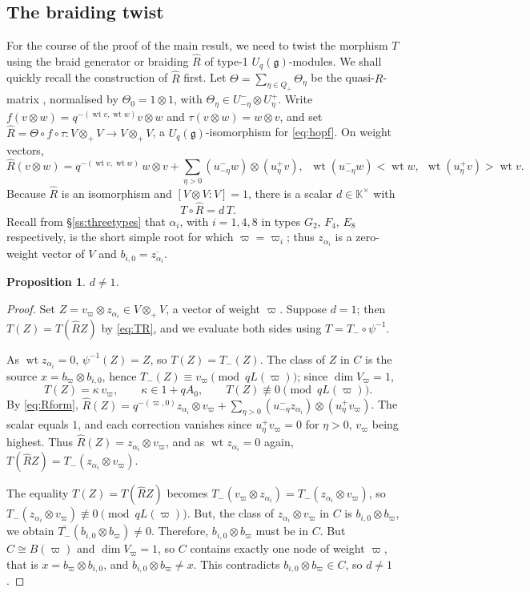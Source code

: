\documentclass[12pt]{amsart}
\theoremstyle{plain}
\newtheorem{proposition}[theorem]{Proposition}
\theoremstyle{remark}
\newcommand{\g}{\mathfrak{g}}
\newcommand{\Uq}{U_q(\g)}
\newcommand{\wt}{\operatorname{wt}}
\newcommand{\ot}{\otimes}
\newcommand{\vp}{\varpi}
\newcommand{\Rhat}{\widehat{R}}
\newcommand{\Qp}{Q_{+}}
\newcommand{\K}{\mathbb{K}}
\begin{document}
\subsection{The braiding twist}\label{ss:braid}
For the course of the proof of the main result, we need to twist the morphism $T$ using the braid generator or braiding  $\Rhat$ of type-1 $\Uq$-modules. We shall quickly recall the construction of $\Rhat$ first. Let $\Theta=\sum_{\eta\in\Qp}\Theta_\eta$ be the quasi-$R$-matrix
\cite[Ch.~7]{Jantzen}, normalised by $\Theta_0=1\ot1$, with
$\Theta_\eta\in U^-_{-\eta}\ot U^+_{\eta}$. Write $f(v\ot w)=q^{-(\wt v,\wt
w)}v\ot w$ and $\tau(v\ot w)=w\ot v$, and set $\Rhat=\Theta\circ f\circ\tau\colon V\ot_+ V\to V\ot_+ V$,
a $\Uq$-isomorphism for \eqref{eq:hopf}. On weight vectors,
\begin{equation}\label{eq:Rform}
\Rhat(v\ot w)=q^{-(\wt v,\wt w)}\,w\ot v
+\sum_{\eta>0}(u^-_{-\eta} w)\ot(u^+_\eta v), \;\;
\wt(u^-_{-\eta} w)<\wt w,\ \ \wt(u^+_\eta v)>\wt v.
\end{equation}
Because $\Rhat$ is an isomorphism and $[V\ot V:V]=1$, there is a scalar
$d\in\K^{\times}$ with
\begin{equation}\label{eq:TR}
T\circ\Rhat=d\,T.
\end{equation}
Recall from \S\ref{ss:threetypes} that $\alpha_i$, with $i=1,4,8$ in types $G_2$,
$F_4$, $E_8$ respectively, is the short simple root for which $\vp=\vp_i$; thus
$z_{\alpha_i}$ is a zero-weight vector of $V$ and $b_{i,0}=\overline{z_{\alpha_i}}$.

\begin{proposition}\label{prop:d}
$d\neq1$.
\end{proposition}

\begin{proof}
Set $Z=v_\vp\ot z_{\alpha_i}\in V\ot_+ V$, a vector of weight $\vp$.
Suppose $d=1$; then $T(Z)=T(\Rhat Z)$ by \eqref{eq:TR}, and we evaluate both sides using $T=T_-\circ\psi^{-1}$.

As $\wt z_{\alpha_i}=0$, $\psi^{-1}(Z)=Z$, so $T(Z)=T_-(Z)$. The class of $Z$ in $C$ is the
source $x=b_\vp\ot b_{i,0}$, hence $T_-(Z)\equiv v_\vp\pmod{qL(\vp)}$; since
$\dim V_\vp=1$,
\[
T(Z)=\kappa\,v_\vp,\qquad \kappa\in1+qA_0,\qquad T(Z)\not\equiv0\pmod{qL(\vp)}.
\]
By \eqref{eq:Rform}, $\Rhat(Z)=q^{-(\vp,0)}z_{\alpha_i}\ot v_\vp+\sum_{\eta>0}(u^-_{-\eta}
z_{\alpha_i})\ot(u^+_\eta v_\vp)$. The scalar equals $1$, and each correction vanishes since
$u^+_\eta v_\vp=0$ for $\eta>0$, $v_\vp$ being highest. Thus $\Rhat(Z)=z_{\alpha_i}\ot
v_\vp$, and as $\wt z_{\alpha_i}=0$ again, $T(\Rhat Z)=T_-(z_{\alpha_i}\ot v_\vp)$.

The equality $T(Z)=T(\Rhat Z)$ becomes $T_-(v_\vp\ot z_{\alpha_i})=T_-(z_{\alpha_i}\ot v_\vp)$, so
$T_-(z_{\alpha_i}\ot v_\vp)\not\equiv0\pmod{qL(\vp)}$. But, the class of $z_{\alpha_i}\ot v_\vp$ in $C$ is $b_{i,0}\ot b_\vp$, we obtain
$\overline{T_-}(b_{i,0}\ot b_\vp)\neq0$. Therefore, $b_{i,0}\ot b_\vp$ must be in $C$. But
$C\cong B(\vp)$ and $\dim V_\vp=1$, so $C$ contains exactly one node of weight $\vp$, that is $x=b_\vp\ot b_{i,0}$, and $b_{i,0}\ot b_\vp\neq x$. This contradicts $b_{i,0}\ot b_\vp\in C$, so $d\neq1$.
\end{proof}
\end{document}
